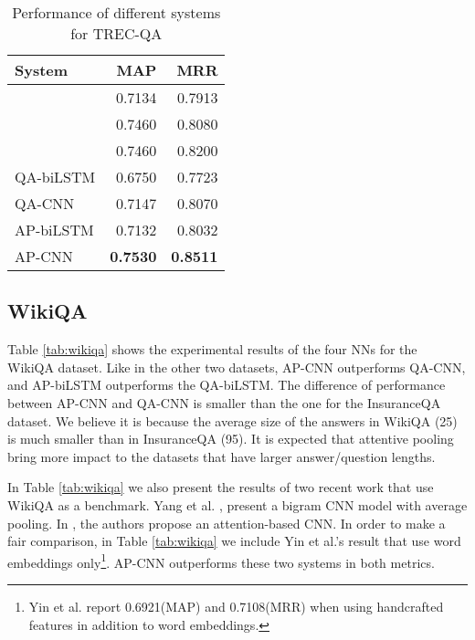 \documentclass{article}
\begin{document}
\begin{table}[ht!]
\caption{Performance of different systems for TREC-QA}
\label{tab:trecqa}
\vskip 0.15in
\begin{center}
\begin{small}
\begin{sc}
\begin{tabular}{lrr}
\hline
\abovespace\belowspace
\bf System & \bf MAP & \bf MRR \\
\hline
\citet{wang2015}             & 0.7134 & 0.7913 \\
\citet{severyn2015}          & 0.7460 & 0.8080 \\
\citet{wang_Ittycheriah2015} & 0.7460 & 0.8200 \\
\hline
QA-biLSTM  & 0.6750 & 0.7723 \\
QA-CNN     & 0.7147 & 0.8070 \\ 
AP-biLSTM  & 0.7132 & 0.8032 \\
AP-CNN     & \bf 0.7530  & \bf 0.8511 \\
\hline
\end{tabular}
\end{sc}
\end{small}
\end{center}
\vskip -0.1in
\end{table}

\subsection{WikiQA}

Table \ref{tab:wikiqa} shows the experimental results of the four NNs for the WikiQA dataset.
Like in the other two datasets,
AP-CNN outperforms QA-CNN,
and AP-biLSTM outperforms the QA-biLSTM.
The difference of performance between AP-CNN and QA-CNN is smaller than the one for the InsuranceQA dataset. We believe it is because the average size of the answers in WikiQA (25) is much smaller than in InsuranceQA (95).
It is expected that attentive pooling bring more impact to the datasets that have larger answer/question lengths.

In Table \ref{tab:wikiqa} we also present the results of two recent work that use WikiQA as a benchmark.
Yang et al. ,
present a bigram CNN model with average pooling. 
In \cite{yin2015},
the authors propose an attention-based CNN.
In order to make a fair comparison,
in Table \ref{tab:wikiqa} we include Yin et al.'s result that use word embeddings only\footnote{Yin et al. \cite{yin2015} report 0.6921(MAP) and 0.7108(MRR) when using handcrafted features in addition to word embeddings.}.
AP-CNN outperforms these two systems in both metrics.
\end{document}
